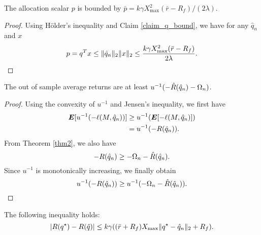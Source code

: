 \begin{claim}
  \label{claim_p_bound}
  The allocation scalar $p$ is bounded by $\bar p = k\gamma X_{\max}^2(\bar r- R_f)/(2\lambda)$.
\end{claim}
\begin{proof}
  Using Hölder's inequality and Claim \ref{claim_q_bound}, we have for any $\hat q_n$ and
  $x$
  \begin{equation*}
    p = q^Tx \leq \|\hat q_n\|_2 \|x\|_2 \leq \frac{k\gamma X_{\max}^2(\bar
      r-R_f)}{2\lambda}.\qedhere
  \end{equation*}
\end{proof}

\begin{claim}
  \label{out_of_sample_claim}
  The out of sample average returns are at least $u^{-1}(-\hat R({\hat q}_n) - \Omega_n)$.
\end{claim}
\begin{proof}
  Using the convexity of $u^{-1}$ and Jensen's inequality, we first have
  \begin{align*}
    \bm E[u^{-1}(-\ell(M,{\hat q}_n))] &\geq u^{-1}(\bm E[-\ell(M,{\hat q}_n)])\\
                                &=u^{-1}(-R({\hat q}_n)).
  \end{align*}
  From Theorem \ref{thm2}, we also have 
  \begin{equation*}
    -R({\hat q}_n) \geq -\Omega_n - \hat R({\hat q}_n).
  \end{equation*}
  Since $u^{-1}$ is monotonically increasing, we finally obtain
  \begin{equation*}
    u^{-1}(-R({\hat q}_n)) \geq u^{-1}(-\Omega_n - \hat R({\hat q}_n)).\qedhere
  \end{equation*}
\end{proof}


\begin{claim}
\label{claim1}
 The following inequality holds:
\begin{equation*}
  |R({q^\star}) - R(\hat q)| \leq k\gamma((\bar r +R_f)X_{\max}\|{q^\star} - {\hat q}_n\|_2 + R_f).
\end{equation*}
\end{claim}

